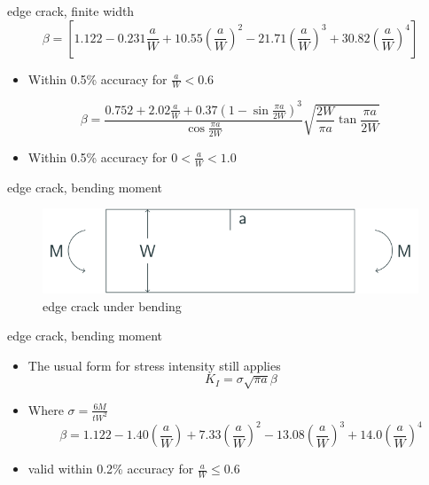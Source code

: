 \documentclass[
  letterpaper,
  ignorenonframetext,
  aspectratio=43,
  handout,
  12pt]{beamer}
\providecommand{\tightlist}{%
  \setlength{\itemsep}{0pt}\setlength{\parskip}{0pt}}
\providecommand{\tightlist}{%
\setlength{\itemsep}{0pt}\setlength{\parskip}{0pt}}
\let\Oldincludegraphics\includegraphics
\renewcommand{\includegraphics}[2][]{\Oldincludegraphics[width=\textwidth,height=0.7\textheight,keepaspectratio]{#2}}
\begin{document}
\begin{frame}{edge crack, finite width}
\protect\hypertarget{edge-crack-finite-width-1}{}
\[\beta = \left[1.122 - 0.231 \frac{a}{W} + 10.55 \left(\frac{a}{W}\right)^2 - 21.71 \left(\frac{a}{W}\right)^3 + 30.82 \left(\frac{a}{W}\right)^4\right]\]

\begin{itemize}
\tightlist
\item
  Within 0.5\% accuracy for \(\frac{a}{W} < 0.6\)
\end{itemize}

\[\beta = \frac{0.752 + 2.02\frac{a}{W} + 0.37\left(1-\sin \frac{\pi a}{2W}\right)^3}{\cos \frac{\pi a}{2W}}\sqrt{\frac{2W}{\pi a} \tan \frac{\pi a}{2W}}\]

\begin{itemize}
\tightlist
\item
  Within 0.5\% accuracy for \(0 < \frac{a}{W} < 1.0\)
\end{itemize}
\end{frame}

\begin{frame}{edge crack, bending moment}
\protect\hypertarget{edge-crack-bending-moment}{}
\begin{figure}
\centering
\includegraphics{../images/bending.svg}
\caption{edge crack under bending}
\end{figure}
\end{frame}

\begin{frame}{edge crack, bending moment}
\protect\hypertarget{edge-crack-bending-moment-1}{}
\begin{itemize}
\tightlist
\item
  The usual form for stress intensity still applies
  \[K_I = \sigma \sqrt{\pi a} \beta\]
\item
  Where \(\sigma = \frac{6M}{tW^2}\)
  \[\beta = 1.122 - 1.40 \left(\frac{a}{W}\right) + 7.33 \left(\frac{a}{W}\right)^2 - 13.08\left(\frac{a}{W}\right)^3 + 14.0 \left(\frac{a}{W}\right)^4\]
\item
  valid within 0.2\% accuracy for \(\frac{a}{W} \le 0.6\)
\end{itemize}
\end{frame}
\end{document}
